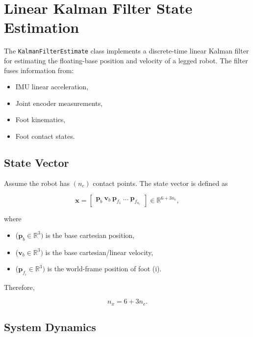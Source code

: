 \section{Linear Kalman Filter State Estimation}

The \texttt{KalmanFilterEstimate} class implements a discrete-time linear Kalman filter for estimating the floating-base position and velocity of a legged robot. The filter fuses information from:

\begin{itemize}
\item IMU linear acceleration,
\item Joint encoder measurements,
\item Foot kinematics,
\item Foot contact states.
\end{itemize}

\subsection{State Vector}

Assume the robot has $(n_c)$ contact points. The state vector is defined as

\begin{equation}
\mathbf{x} =\begin{bmatrix}
\mathbf{p}_b \
\mathbf{v}_b \
\mathbf{p}_{f_1} \
\hdots \
\mathbf{p}_{f_{n_c}}
\end{bmatrix}
\in \mathbb{R}^{6+3n_c},
\end{equation}

where

\begin{itemize}
\item ($\mathbf{p}_b \in \mathbb{R}^{3})$ is the base cartesian position,
\item ($\mathbf{v}_b \in \mathbb{R}^{3})$ is the base cartesian/linear velocity,
\item ($\mathbf{p}_{f_i} \in \mathbb{R}^{3})$ is the world-frame position of foot (i).
\end{itemize}

Therefore,

\begin{equation}
n_x = 6 + 3n_c .
\end{equation}

\subsection{System Dynamics}

